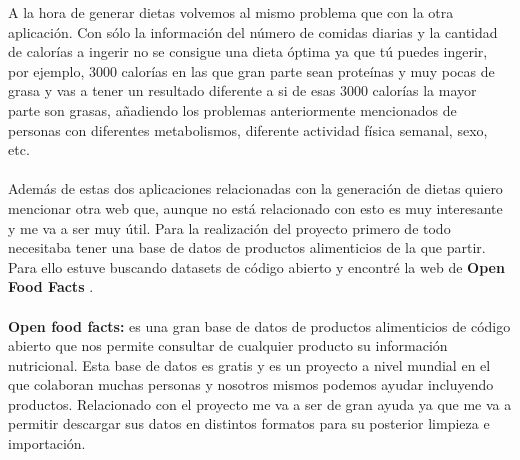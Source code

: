 A la hora de generar dietas volvemos al mismo problema que con la otra aplicación. Con sólo la información del número de comidas diarias y la cantidad de calorías a ingerir
no se consigue una dieta óptima ya que tú puedes ingerir, por ejemplo, 3000 calorías en las que gran parte sean proteínas y muy pocas de grasa y vas a tener un resultado diferente a si de 
esas 3000 calorías la mayor parte son grasas, añadiendo los problemas anteriormente mencionados de personas con diferentes metabolismos, diferente actividad física semanal, sexo, etc.
\\\\ 
Además de estas dos aplicaciones relacionadas con la generación de dietas quiero mencionar otra web que, aunque no está relacionado con esto es muy interesante y me va a ser muy útil.
Para la realización del proyecto primero de todo necesitaba tener una base de datos de productos alimenticios de la que partir. Para ello estuve buscando datasets de código abierto y encontré la web de \textbf{Open Food Facts} \cite{OpenFoodFacts}.
\\\\
\textbf{Open food facts:} es una gran base de datos de productos alimenticios de código abierto que nos permite consultar de cualquier producto su información nutricional.
Esta base de datos es gratis y es un proyecto a nivel mundial en el que colaboran muchas personas y nosotros mismos podemos ayudar incluyendo productos.
Relacionado con el proyecto me va a ser de gran ayuda ya que me va a permitir descargar sus datos en distintos formatos para su posterior limpieza e importación.

